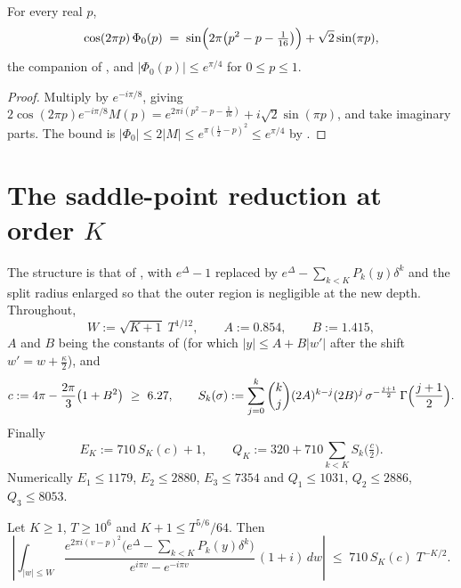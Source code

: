 \begin{corollary}
\label{cor:rsg_phi_closed}
For every real $p$,
\[
  \cos(2\pi p)\,\Phi_{0}(p)\;=\;\sin\Bigl(2\pi\bigl(p^{2}-p-\tfrac1{16}\bigr)\Bigr)+\sqrt2\sin(\pi p),
\]
the companion of , and $\lvert\Phi_{0}(p)\rvert\le e^{\pi/4}$
for $0\le p\le1$.
\end{corollary}

\begin{proof}
Multiply  by $e^{-i\pi/8}$, giving
$2\cos(2\pi p)e^{-i\pi/8}M(p)=e^{2\pi i(p^{2}-p-\frac1{16})}+i\sqrt2\sin(\pi p)$, and take
imaginary parts.  The bound is
$\lvert\Phi_{0}\rvert\le2\lvert M\rvert\le e^{\pi(\frac12-p)^{2}}\le e^{\pi/4}$ by
.
\end{proof}

\section{The saddle-point reduction at order \texorpdfstring{$K$}{K}}
\label{sec:rsg_saddle}

The structure is that of , with $e^{\Delta}-1$ replaced by
$e^{\Delta}-\sum_{k<K}P_{k}(y)\delta^{k}$ and the split radius enlarged so that the outer region
is negligible at the new depth.  Throughout,
\[
  W:=\sqrt{K+1}\;T^{1/12},\qquad A:=0.854,\qquad B:=1.415,
\]
$A$ and $B$ being the constants of  (for which
$\lvert y\rvert\le A+B\lvert w'\rvert$ after the shift $w'=w+\tfrac\kappa2$), and
\[
  c:=4\pi-\frac{2\pi}3\bigl(1+B^{2}\bigr)\ \ge\ 6.27,\qquad
  S_{k}(\sigma):=\sum_{j=0}^{k}\binom kj(2A)^{k-j}(2B)^{j}\,
     \sigma^{-\frac{j+1}2}\,\Gamma\Bigl(\frac{j+1}2\Bigr).
\]
Finally
\[
  E_{K}:=710\,S_{K}(c)+1,\qquad
  Q_{K}:=320+710\sum_{k<K}S_{k}\bigl(\tfrac c2\bigr).
\]
Numerically $E_{1}\le1179$, $E_{2}\le2880$, $E_{3}\le7354$ and
$Q_{1}\le1031$, $Q_{2}\le2886$, $Q_{3}\le8053$.

\begin{lemma}
\label{lem:rsg_inner}
Let $K\ge1$, $T\ge10^{6}$ and $K+1\le T^{5/6}/64$.  Then
\[
  \left\lvert\int_{\lvert w\rvert\le W}
    \frac{e^{2\pi i(v-p)^{2}}\bigl(e^{\Delta}-\sum_{k<K}P_{k}(y)\delta^{k}\bigr)}
         {e^{i\pi v}-e^{-i\pi v}}\,(1+i)\,dw
  \right\rvert\;\le\;710\,S_{K}(c)\;T^{-K/2}.
\]
\end{lemma}

